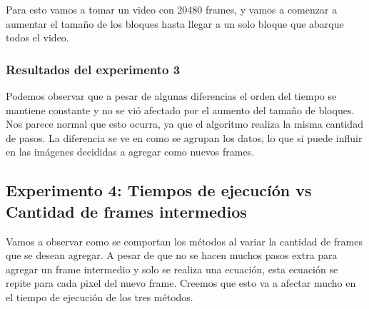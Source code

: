 \par Para esto vamos a tomar un video con 20480 frames, y vamos a comenzar a aumentar el tama\~no de los bloques hasta llegar a un solo bloque que abarque todos el video.


\subsubsection{Resultados del experimento 3}
\begin{figure}[ht]
	\begin{center}
	\end{center}
\end{figure}
\par Podemos observar que a pesar de algunas diferencias el orden del tiempo se mantiene constante y no se vi\'o afectado por el aumento del tama\~no de bloques. Nos parece normal que esto ocurra, ya que el algoritmo realiza la misma cantidad de pasos. La diferencia se ve en como se agrupan los datos, lo que si puede influir en las im\'agenes decididas a agregar como nuevos frames.



\subsection{Experimento 4: Tiempos de ejecucí\'on vs Cantidad de frames intermedios}
\par Vamos a observar como se comportan los m\'etodos al variar la cantidad de frames que se desean agregar. A pesar de que no se hacen muchos pasos extra para agregar un frame intermedio y solo se realiza una ecuaci\'on, esta ecuaci\'on se repite para cada pixel del nuevo frame. Creemos que esto va a afectar mucho en el tiempo de ejecuci\'on de los tres m\'etodos.

